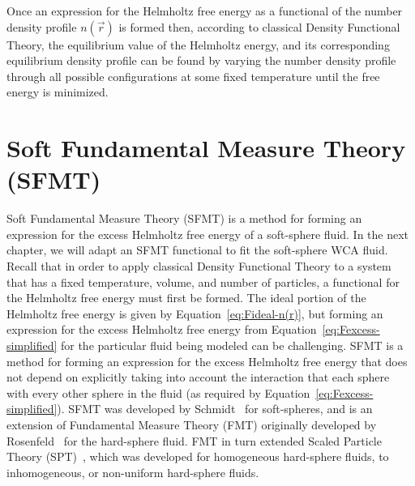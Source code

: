 \documentclass[double,12pt]{beavtex}
\begin{document}
Once an expression for the Helmholtz free energy as a functional of the
number density profile $n(\vec r)$ is formed then, according to classical 
Density Functional Theory, the equilibrium value of the 
Helmholtz energy, and its corresponding equilibrium density profile can be
found by varying the number density profile
through all possible configurations at some fixed temperature
until the free energy is minimized.  

\section{Soft Fundamental Measure Theory (SFMT)}
Soft Fundamental Measure Theory (SFMT) is a method for forming an 
expression for the excess Helmholtz free energy of a soft-sphere fluid.
In the next chapter, 
we will adapt an SFMT functional to fit the soft-sphere WCA fluid.
Recall that in order to apply classical Density Functional Theory 
to a system that has a fixed temperature, volume, and number of particles, 
a functional for the Helmholtz free energy must first be formed. 
The ideal portion of the Helmholtz free energy is given by 
Equation~\ref{eq:Fideal-n(r)}, but forming an expression for the excess 
Helmholtz free energy from Equation~\ref{eq:Fexcess-simplified} for the 
particular fluid being modeled can be challenging. 
SFMT is a method for forming an 
expression for the excess Helmholtz free energy
that does not depend on explicitly taking into account the interaction 
that each sphere with every other sphere in the fluid (as required by 
Equation~\ref{eq:Fexcess-simplified}).
SFMT was developed by Schmidt~\cite{schmidt1999density, schmidt2000fluid} 
for soft-spheres, and is an extension of Fundamental Measure Theory (FMT) 
originally developed by 
Rosenfeld~\cite{rosenfeld1989, rosenfeld1994, rosenfeld1996, fmtfromsptandsignerror} 
for the hard-sphere fluid. FMT in turn extended  
Scaled Particle Theory (SPT)~\cite{ReissSPT, santos2012phi3}, which was 
developed for homogeneous hard-sphere fluids, 
to inhomogeneous, or non-uniform hard-sphere fluids.
\end{document}
